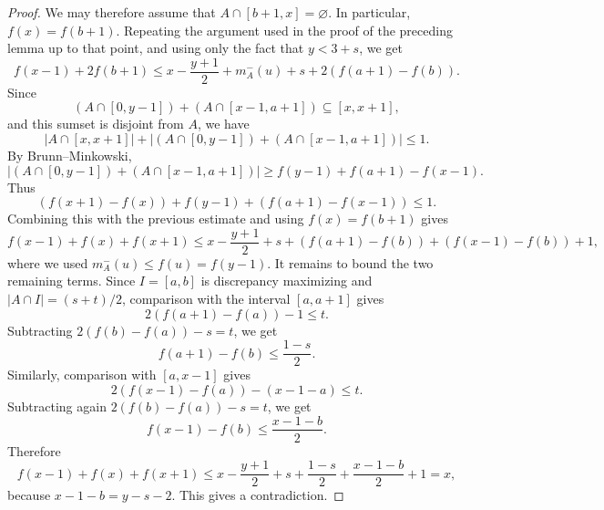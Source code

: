 \documentclass[11pt,reqno]{amsart}
\theoremstyle{definition}
\def\F#1{f(#1)}
\begin{document}
\begin{proof}
We may therefore assume that $A\cap[b+1,x]=\varnothing$. In particular, $\F{x}=\F{b+1}$. Repeating the argument used in the proof of the preceding lemma up to that point, and using only the fact that $y<3+s$, we get
$$
\F{x-1}+2\F{b+1}
\leq
x-\frac{y+1}{2}+m_A^-(u)+s+2(\F{a+1}-\F{b}).
$$
Since
$$
(A\cap[0,y-1])+(A\cap[x-1,a+1])\subseteq [x,x+1],
$$
and this sumset is disjoint from $A$, we have
$$
|A\cap[x,x+1]|+
|(A\cap[0,y-1])+(A\cap[x-1,a+1])|
\leq 1.
$$
By Brunn--Minkowski,
$$
|(A\cap[0,y-1])+(A\cap[x-1,a+1])|
\geq \F{y-1}+\F{a+1}-\F{x-1}.
$$
Thus
$$
(\F{x+1}-\F{x})+\F{y-1}+(\F{a+1}-\F{x-1})\leq 1.
$$
Combining this with the previous estimate and using $\F{x}=\F{b+1}$ gives
$$
\F{x-1}+\F{x}+\F{x+1}
\leq
x-\frac{y+1}{2}+s+(\F{a+1}-\F{b})+(\F{x-1}-\F{b})+1,
$$
where we used $m_A^-(u)\leq \F{u}=\F{y-1}$.
It remains to bound the two remaining terms. Since $I=[a,b]$ is discrepancy maximizing and
$|A\cap I|=(s+t)/2$, comparison with the interval $[a,a+1]$ gives
$$
2(\F{a+1}-\F{a})-1\leq t.
$$
Subtracting $2(\F{b}-\F{a})-s=t$, we get
$$
\F{a+1}-\F{b}\leq \frac{1-s}{2}.
$$
Similarly, comparison with $[a,x-1]$ gives
$$
2(\F{x-1}-\F{a})-(x-1-a)\leq t.
$$
Subtracting again $2(\F{b}-\F{a})-s=t$, we get
$$
\F{x-1}-\F{b}\leq \frac{x-1-b}{2}.
$$
Therefore
$$
\F{x-1}+\F{x}+\F{x+1}
\leq
x-\frac{y+1}{2}+s+\frac{1-s}{2}+\frac{x-1-b}{2}+1
=
x,
$$
because $x-1-b=y-s-2$. This gives a contradiction.
\end{proof}
\end{document}
